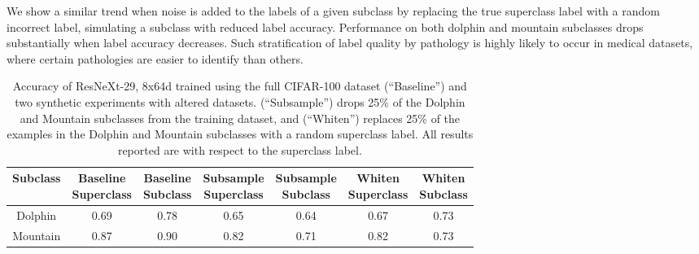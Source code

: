\documentclass{article}
\begin{document}
We show a similar trend when noise is added to the labels of a given subclass by replacing the true superclass label with a random incorrect label, simulating a subclass with reduced label accuracy.
Performance on both dolphin and mountain subclasses drops substantially when label accuracy decreases.  
Such stratification of label quality by pathology is highly likely to occur in medical datasets, where certain pathologies are easier to identify than others.

\begin{table}[]
\centering
\begin{tabular}{|c|c|c|c|c|c|c|}
\hline
 Subclass & \makecell{Baseline \\ Superclass} & \makecell{Baseline \\ Subclass}   &  \makecell{Subsample \\ Superclass}    & \makecell{Subsample \\ Subclass}  &  \makecell{Whiten \\ Superclass}    & \makecell{Whiten \\ Subclass} \\
 \hline
 Dolphin & 0.69 & 0.78  & 0.65  & 0.64 & 0.67  & 0.73   \\
 Mountain & 0.87 & 0.90  & 0.82 & 0.71 & 0.82 & 0.73  \\
 \hline
\end{tabular}
\caption{Accuracy of ResNeXt-29, 8x64d trained using the full CIFAR-100 dataset (``Baseline'') and two synthetic experiments with altered datasets. (``Subsample'') drops 25\% of the Dolphin and Mountain subclasses from the training dataset, and (``Whiten'') replaces 25\% of the examples in the Dolphin and Mountain subclasses with a random superclass label.  All results reported are with respect to the superclass label.}
\label{tab:cifar1}
\vspace{-4mm}
\end{table}

\end{document}

